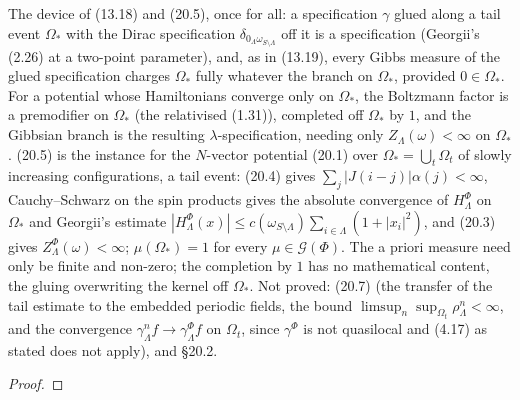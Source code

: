 \begin{theorem}
    The device of (13.18) and (20.5), once for all: a specification $\gamma$ glued along a tail
    event $\Omega_*$ with the Dirac specification $\delta_{0_\Lambda\omega_{S\setminus\Lambda}}$ off it is
    a specification (Georgii's (2.26) at a two-point parameter), and, as in (13.19), every Gibbs
    measure of the glued specification charges $\Omega_*$ fully whatever the branch on $\Omega_*$,
    provided $0 \in \Omega_*$. For a potential whose Hamiltonians converge only on $\Omega_*$, the
    Boltzmann factor is a premodifier on $\Omega_*$ (the relativised (1.31)), completed off
    $\Omega_*$ by $1$, and the Gibbsian branch is the resulting $\lambda$-specification, needing
    only $Z_\Lambda(\omega) < \infty$ on $\Omega_*$. (20.5) is the instance for the $N$-vector
    potential (20.1) over $\Omega_* = \bigcup_t \Omega_t$ of slowly increasing configurations, a
    tail event: (20.4) gives $\sum_j |J(i-j)|\alpha(j) < \infty$, Cauchy--Schwarz on the spin
    products gives the absolute convergence of $H^\Phi_\Lambda$ on $\Omega_*$ and Georgii's estimate
    $|H^\Phi_\Lambda(x)| \leq c(\omega_{S\setminus\Lambda})\sum_{i\in\Lambda}(1+|x_i|^2)$, and (20.3)
    gives $Z^\Phi_\Lambda(\omega) < \infty$; $\mu(\Omega_*) = 1$ for every $\mu \in \mathcal G(\Phi)$.
    The a priori measure need only be finite and non-zero; the completion by $1$ has no
    mathematical content, the gluing overwriting the kernel off $\Omega_*$. Not proved: (20.7)
    (the transfer of the tail estimate to the embedded periodic fields, the bound
    $\limsup_n\sup_{\Omega_t}\rho^n_\Lambda < \infty$, and the convergence $\gamma^n_\Lambda f \to
    \gamma^\Phi_\Lambda f$ on $\Omega_t$, since $\gamma^\Phi$ is not quasilocal and (4.17) as stated does
    not apply), and \S20.2.
\end{theorem}
\begin{proof}
    \leanok
\end{proof}

